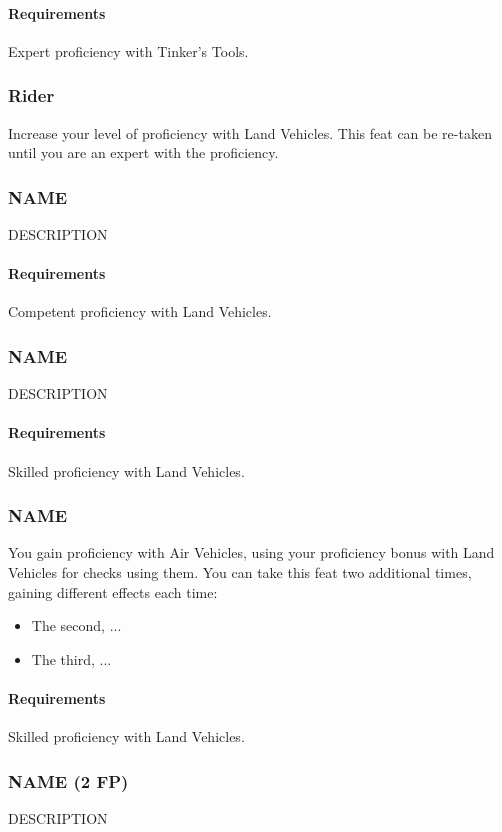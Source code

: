     \paragraph{Requirements} Expert proficiency with Tinker's Tools.
\subsubsection{Rider} \label{feat::rider}
    Increase your level of proficiency with Land Vehicles.
    This feat can be re-taken until you are an expert with the proficiency.
\subsubsection{NAME} \label{feat::name}
    DESCRIPTION
    \paragraph{Requirements} Competent proficiency with Land Vehicles.
\subsubsection{NAME} \label{feat::name}
    DESCRIPTION
    \paragraph{Requirements} Skilled proficiency with Land Vehicles.
\subsubsection{NAME} \label{feat::name}
    You gain proficiency with Air Vehicles, using your proficiency bonus with Land Vehicles for checks using them.
    You can take this feat two additional times, gaining different effects each time:
    \begin{itemize}
        \item The second, ...
        \item The third, ... %
    \end{itemize}
    \paragraph{Requirements} Skilled proficiency with Land Vehicles.
\subsubsection{NAME (2 FP)} \label{feat::name}
    DESCRIPTION
